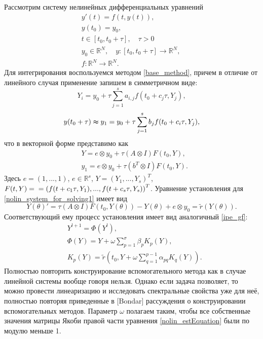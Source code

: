 \documentclass[a4paper,14pt]{extreport}
\begin{document}
Рассмотрим систему нелинейных дифференциальных уравнений
	\begin{equation}
	\begin{aligned}
	\label{nolin_main_problem}
	&y'(t)=f(t, y(t)),\\
	&y(t_0)=y_0,\\
	&t \in [t_0, t_0+\tau],\quad \tau>0 \\
	&y_0\in \mathbb{R}^N,\quad
	y:[t_0,t_0+\tau] \to \mathbb{R}^N,\quad\\
	&f:  \mathbb{R}^N \to \mathbb{R}^N.
	\end{aligned}
	\end{equation}
Для интегрирования воспользуемся методом \eqref{base_method}, причем в отличие от линейного случая применение запишем в симметричном виде:
	$$Y_i = y_0+\tau \sum_{j = 1}^s a_{i,j}f(t_0+c_j \tau,Y_j), $$
	$$y(t_0+\tau)\thickapprox y_1 = y_0 + \tau \sum_{j = 1}^s b_{j}f(t_0+c_i \tau,Y_j),$$
что в векторной форме представимо как
	\begin{equation}
	\begin{aligned}
	\label{nolin_system_for_solving1}
	&Y = e\otimes y_0 +\tau (A\otimes I)F(t_0,Y),\\
	&y_1 = e\otimes y_0 +\tau(b^T\otimes I)F(t_0,Y).
	\end{aligned}
	\end{equation}
Здесь $e = (1,..., 1)$, $e \in \mathbb R^s$,  $Y = (Y_1, ...,Y_s)^T$, $F(t, Y) =\\= \left(f(t+c_1 \tau,Y_1),..., f(t+c_s \tau,Y_s) \right)^T$.
Уравнение установления для \eqref{nolin_system_for_solving1} имеет вид
	\begin{equation}
	\label{nolin_estEquation} Y(\theta)'=\tau (A\otimes I)F(t_0,Y(\theta)) -Y(\theta)+ e\otimes y_0 = \tilde r(Y(\theta)).
	\end{equation}
Соответствующий ему процесс установления имеет вид аналогичный \eqref{ipe_gf}:
	\begin{equation}
	\label{nolin_ipe_gf}
	\begin{aligned}
	&Y^{l+1}=\Phi(Y^{l}),\\
	&\Phi(Y)=Y+\omega \sum_{p=1}^{\sigma}\beta_{p}K_p(Y),\\
	&K_p(Y)=\tilde r(t_0,Y+\omega \sum_{q=1}^{p-1}\alpha_{pq}K_q(Y)).
	\end{aligned}
	\end{equation}
Полностью повторить конструирование вспомогательного метода как в случае
линейной системы вообще говоря нельзя. Однако если задача позволяет, то можно
провести линеаризацию и исследовать спектральные свойства уже для неё, полностью
повторяя приведенные в [Bondar] рассуждения о конструировании вспомогательных методов.
Параметр $\omega$ полагаем таким, чтобы все собственные значения матрицы Якоби
правой части уравнения \eqref{nolin_estEquation} были по модулю меньше 1.
  
\end{document}
